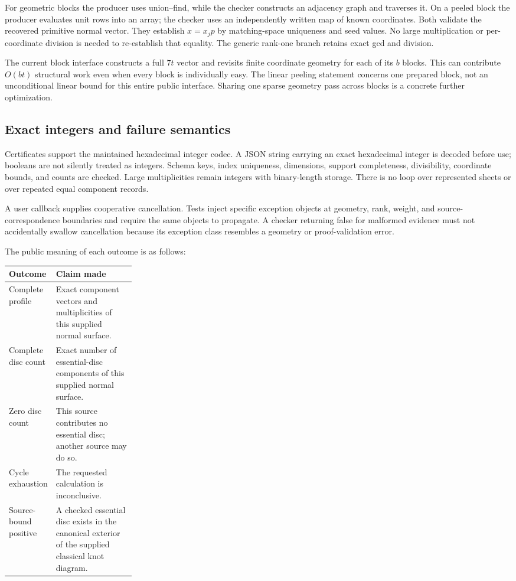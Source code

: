 For geometric blocks the producer uses union--find, while the checker constructs
an adjacency graph and traverses it.  On a peeled block the producer evaluates
unit rows into an array; the checker uses an independently written map of
known coordinates.  Both validate the recovered primitive normal vector.
They establish $x=x_jp$ by matching-space uniqueness and seed values.  No
large multiplication or per-coordinate division is needed to re-establish
that equality.  The generic rank-one branch retains exact gcd and division.

The current block interface constructs a full $7t$ vector and revisits finite
coordinate geometry for each of its $b$ blocks.  This can contribute $O(bt)$
structural work even when every block is individually easy.  The linear
peeling statement concerns one prepared block, not an unconditional linear
bound for this entire public interface.  Sharing one sparse geometry pass
across blocks is a concrete further optimization.

\subsection{Exact integers and failure semantics}

Certificates support the maintained hexadecimal integer codec.  A JSON string
carrying an exact hexadecimal integer is decoded before use; booleans are not
silently treated as integers.  Schema keys, index uniqueness, dimensions,
support completeness, divisibility, coordinate bounds, and counts are checked.
Large multiplicities remain integers with binary-length storage.  There is
no loop over represented sheets or over repeated equal component records.

A user callback supplies cooperative cancellation.  Tests inject specific
exception objects at geometry, rank, weight, and source-correspondence boundaries
and require the same objects to propagate.  A checker returning false for
malformed evidence must not accidentally swallow cancellation because its
exception class resembles a geometry or proof-validation error.

The public meaning of each outcome is as follows:
\begin{center}
\begin{tabularx}{\linewidth}{@{}p{0.25\linewidth}X@{}}
\toprule
Outcome & Claim made \\
\midrule
Complete profile & Exact component vectors and multiplicities of this supplied
normal surface.\\
Complete disc count & Exact number of essential-disc components of this
supplied normal surface.\\
Zero disc count & This source contributes no essential disc; another source
may do so.\\
Cycle exhaustion & The requested calculation is inconclusive.\\
Source-bound positive & A checked essential disc exists in the canonical
exterior of the supplied classical knot diagram.\\
\bottomrule
\end{tabularx}
\end{center}

